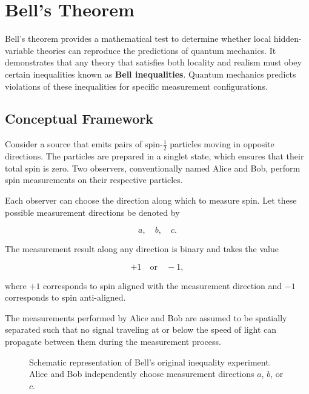 \documentclass[14pt,a4paper]{extarticle}
\begin{document}
\section{Bell's Theorem}

Bell’s theorem provides a mathematical test to determine whether local hidden-variable theories can reproduce the predictions of quantum mechanics. It demonstrates that any theory that satisfies both locality and realism must obey certain inequalities known as \textbf{Bell inequalities}. Quantum mechanics predicts violations of these inequalities for specific measurement configurations.


\subsection{Conceptual Framework}

Consider a source that emits pairs of spin-$\frac{1}{2}$ particles moving in opposite directions. The particles are prepared in a singlet state, which ensures that their total spin is zero. Two observers, conventionally named Alice and Bob, perform spin measurements on their respective particles.

Each observer can choose the direction along which to measure spin. Let these possible measurement directions be denoted by

\[
a, \quad b, \quad c.
\]

The measurement result along any direction is binary and takes the value

\[
+1 \quad \text{or} \quad -1,
\]

where $+1$ corresponds to spin aligned with the measurement direction and $-1$ corresponds to spin anti-aligned.

The measurements performed by Alice and Bob are assumed to be spatially separated such that no signal traveling at or below the speed of light can propagate between them during the measurement process.
\begin{figure}[h]
\centering
{}
\caption{Schematic representation of Bell's original inequality experiment. Alice and Bob independently choose measurement directions $a$, $b$, or $c$.}
\end{figure}
\end{document}
